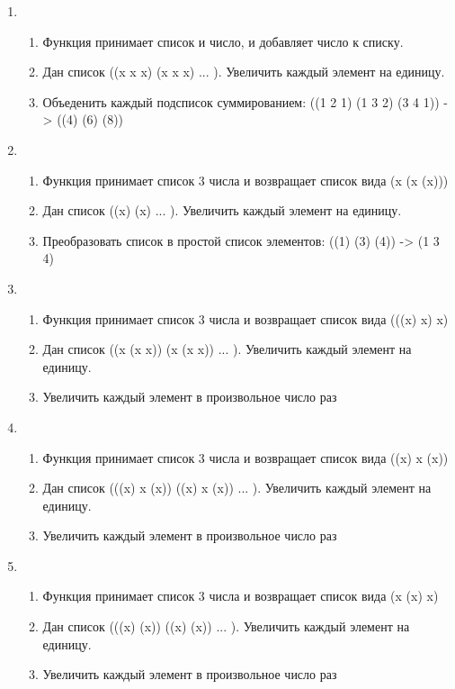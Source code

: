 \documentclass[a4paper,12pt]{article}
\begin{document}
\begin{enumerate}
	\item \begin{enumerate}
		\item Функция принимает список и число, и добавляет число к списку.
		\item Дан список ((x x x) (x x x) ... ). Увеличить каждый элемент на единицу.
		\item Объеденить каждый подсписок суммированием: ((1 2 1) (1 3 2) (3 4 1)) -> ((4) (6) (8))
	\end{enumerate}

	\item \begin{enumerate}
		\item Функция принимает список 3 числа и возвращает список вида (x (x (x)))
		\item Дан список ((x) (x) ... ). Увеличить каждый элемент на единицу.
		\item Преобразовать список в простой список элементов: ((1) (3) (4)) -> (1 3 4)
	\end{enumerate}

	\item \begin{enumerate}
		\item Функция принимает список 3 числа и возвращает список вида (((x) x) x)
		\item Дан список ((x (x x)) (x (x x)) ... ). Увеличить каждый элемент на единицу.
		\item Увеличить каждый элемент в произвольное число раз
	\end{enumerate}

	\item \begin{enumerate}
		\item Функция принимает список 3 числа и возвращает список вида ((x) x (x))
		\item Дан список (((x) x (x)) ((x) x (x)) ... ). Увеличить каждый элемент на единицу.
		\item Увеличить каждый элемент в произвольное число раз
	\end{enumerate}

	\item \begin{enumerate}
		\item Функция принимает список 3 числа и возвращает список вида (x (x) x)
		\item Дан список (((x) (x)) ((x) (x)) ... ). Увеличить каждый элемент на единицу.
		\item Увеличить каждый элемент в произвольное число раз
	\end{enumerate}


\end{enumerate}
\end{document}
